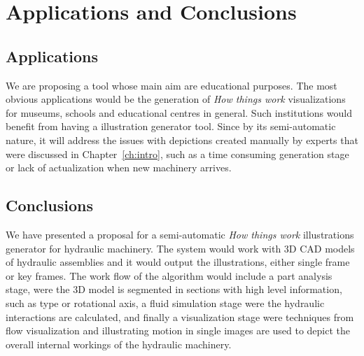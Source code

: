 \chapter{Applications and Conclusions}

\section{Applications}

We are proposing a tool whose main aim are educational purposes.
The most obvious applications would be the generation of \textit{How things work} visualizations for museums, schools and educational centres in general.
Such institutions would benefit from having a illustration generator tool.
Since by its semi-automatic nature, it will address the issues with depictions created manually by experts that were discussed in Chapter~\ref{ch:intro}, such as a time consuming generation stage or lack of actualization when new machinery arrives.

\section{Conclusions}

We have presented a proposal for a semi-automatic \textit{How things work} illustrations generator for hydraulic machinery.
The system would work with 3D CAD models of hydraulic assemblies and it would output the illustrations, either single frame or key frames.
The work flow of the algorithm would include a part analysis stage, were the 3D model is segmented in sections with high level information, such as type or rotational axis, a fluid simulation stage were the hydraulic interactions are calculated, and finally a visualization stage were techniques from flow visualization and illustrating motion in single images are used to depict the overall internal workings of the hydraulic machinery.